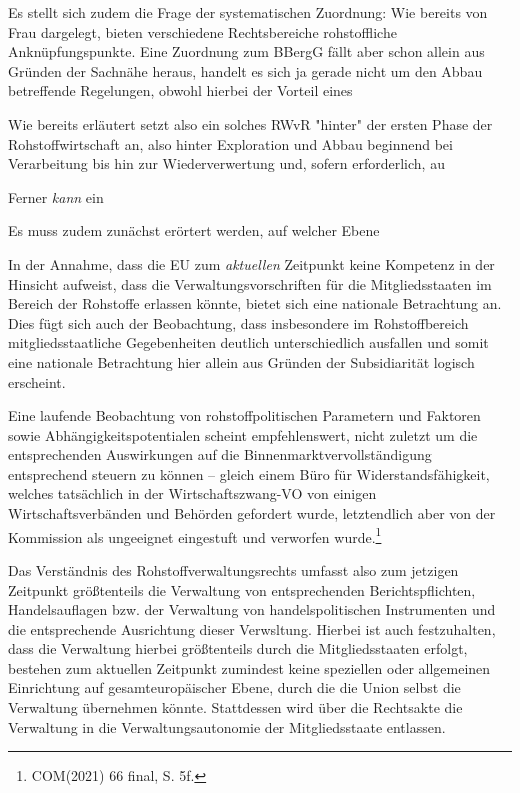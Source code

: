 \documentclass[12pt,a4paper,oneside]{book} %
\begin{document}
Es stellt sich zudem die Frage der systematischen Zuordnung: Wie bereits von Frau \autocite{frau2023} dargelegt, bieten verschiedene Rechtsbereiche rohstoffliche Anknüpfungspunkte. Eine Zuordnung zum BBergG fällt aber schon allein aus Gründen der Sachnähe heraus, handelt es sich ja gerade nicht um den Abbau betreffende Regelungen, obwohl hierbei der Vorteil eines

Wie bereits erläutert setzt also ein solches RWvR "hinter" der ersten Phase der Rohstoffwirtschaft an, also hinter Exploration und Abbau beginnend bei Verarbeitung bis hin zur Wiederverwertung und, sofern erforderlich, au

Ferner \textit{kann} ein 

Es muss zudem zunächst erörtert werden, auf welcher Ebene

In der Annahme, dass die EU zum \textit{aktuellen} Zeitpunkt keine Kompetenz in der Hinsicht aufweist, dass die Verwaltungsvorschriften für die Mitgliedsstaaten im Bereich der Rohstoffe erlassen könnte, bietet sich eine nationale Betrachtung an. Dies fügt sich auch der Beobachtung, dass insbesondere im Rohstoffbereich mitgliedsstaatliche Gegebenheiten deutlich unterschiedlich ausfallen und somit eine nationale Betrachtung hier allein aus Gründen der Subsidiarität logisch erscheint.

Eine laufende Beobachtung von rohstoffpolitischen Parametern und Faktoren sowie Abhängigkeitspotentialen scheint empfehlenswert, nicht zuletzt um die entsprechenden Auswirkungen auf die Binnenmarktvervollständigung entsprechend steuern zu können -- gleich einem \glqq Büro für Widerstandsfähigkeit\grqq, welches tatsächlich in der Wirtschaftszwang-VO von einigen Wirtschaftsverbänden und Behörden gefordert wurde, letztendlich aber von der Kommission als ungeeignet eingestuft und verworfen wurde.\footnote{COM(2021) 66 final, S. 5f.}

Das Verständnis des Rohstoffverwaltungsrechts umfasst also zum jetzigen Zeitpunkt größtenteils die Verwaltung von entsprechenden Berichtspflichten, Handelsauflagen bzw. der Verwaltung von handelspolitischen Instrumenten und die entsprechende Ausrichtung dieser Verwsltung. Hierbei ist auch festzuhalten, dass die Verwaltung hierbei größtenteils durch die Mitgliedsstaaten erfolgt, bestehen zum aktuellen Zeitpunkt zumindest keine speziellen oder allgemeinen Einrichtung auf gesamteuropäischer Ebene, durch die die Union selbst die Verwaltung übernehmen könnte. Stattdessen wird über die Rechtsakte die Verwaltung in die Verwaltungsautonomie der Mitgliedsstaate entlassen.
\end{document}
